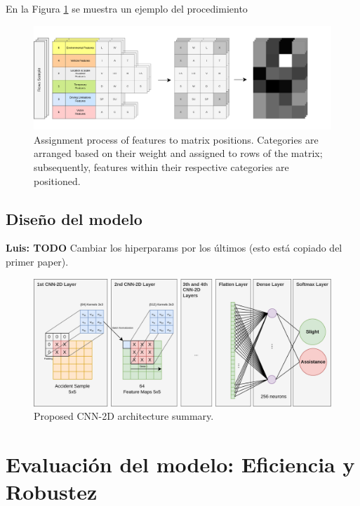 \documentclass{uathesis-es}
\begin{document}
En la Figura \ref{MatrixConstruction} se muestra un ejemplo del procedimiento 

\begin{figure}[H]
    \centering
    \includegraphics[width=17cm]{Figures/Matrix Construction_2.png}
    \caption{Assignment process of features to matrix positions. Categories are arranged based on their weight and assigned to rows of the matrix; subsequently, features within their respective categories are positioned.}
    \label{MatrixConstruction}
\end{figure}

\subsection{Diseño del modelo}

\textbf{Luis: TODO} Cambiar los hiperparams por los últimos (esto está copiado del primer paper).\\



\begin{figure}[H]
    \centering
    \includegraphics[width=15cm]{Figures/SIMPLE.png}
    \caption{Proposed CNN-2D architecture summary.}
    \label{CNN2DArchitecture}
\end{figure}

\section{Evaluación del modelo: Eficiencia y Robustez}
\end{document}
